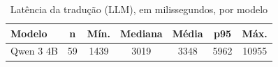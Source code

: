 \begin{table}[htbp!]
\centering
\caption{Latência da tradução (LLM), em milissegundos, por modelo}
\label{tab:latencia_estacao}
\small
\begin{tabular}{|l|c|c|c|c|c|c|}
\hline
\textbf{Modelo} & \textbf{n} & \textbf{Mín.} & \textbf{Mediana} & \textbf{Média} & \textbf{p95} & \textbf{Máx.} \\
\hline
Qwen 3 4B & 59 & 1439 & 3019 & 3348 & 5962 & 10955 \\
\hline
\end{tabular}
\end{table}
